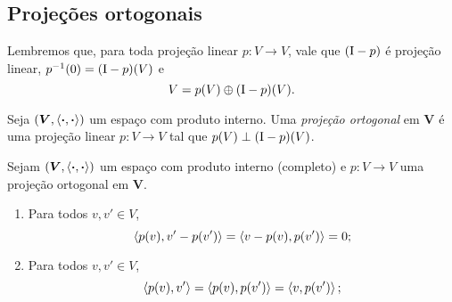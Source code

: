 \subsection{Projeções ortogonais}

Lembremos que, para toda projeção linear $p\colon V \to V$, vale que $(\mathrm{I}-p)$ é projeção linear, $p^{-1}(0) = (\mathrm{I}-p)(V)$ e
	\begin{equation*}
	V = p(V) \oplus (\mathrm{I}-p)(V).
	\end{equation*}

\begin{definition}
Seja $(\bm V, \left\langle{\bm{\cdot}},{\bm{\cdot}}\right\rangle)$ um espaço com produto interno. Uma \emph{projeção ortogonal} em $\bm V$ é uma projeção linear $p\colon V \to V$ tal que $p(V) \perp (\mathrm{I}-p)(V)$.
\end{definition}

\begin{proposition}
Sejam $(\bm V, \left\langle{\bm{\cdot}},{\bm{\cdot}}\right\rangle)$ um espaço com produto interno (completo) e $p\colon V \to V$ uma projeção ortogonal em $\bm V$.
	\begin{enumerate}
	\item Para todos $v,v' \in V$,
		\begin{equation*}
		\left\langle{p(v)},{v' - p(v')}\right\rangle = \left\langle{v-p(v)},{p(v')}\right\rangle = 0;
		\end{equation*}

	\item Para todos $v,v' \in V$,
		\begin{equation*}
		\left\langle{p(v)},{v'}\right\rangle = \left\langle{p(v)},{p(v')}\right\rangle = \left\langle{v},{p(v')}\right\rangle;
		\end{equation*}
	\end{enumerate}
\end{proposition}

